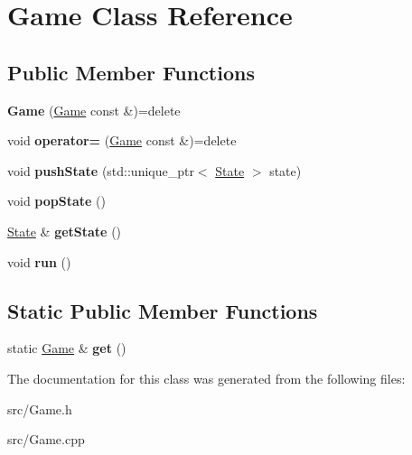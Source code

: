 \hypertarget{classGame}{\section{Game Class Reference}
\label{classGame}
}
\subsection*{Public Member Functions}
\begin{DoxyCompactItemize}
\item 
\hypertarget{classGame_a586a831ed5ff1283fcf1b96f4eff065c}{{\bfseries Game} (\hyperlink{classGame}{Game} const \&)=delete}\label{classGame_a586a831ed5ff1283fcf1b96f4eff065c}

\item 
\hypertarget{classGame_aa4c0eacd8656e54ec4e94877c453e531}{void {\bfseries operator=} (\hyperlink{classGame}{Game} const \&)=delete}\label{classGame_aa4c0eacd8656e54ec4e94877c453e531}

\item 
\hypertarget{classGame_aa808b50e4c19c3ca8907d6a3ab1f473e}{void {\bfseries push\-State} (std\-::unique\-\_\-ptr$<$ \hyperlink{classState}{State} $>$ state)}\label{classGame_aa808b50e4c19c3ca8907d6a3ab1f473e}

\item 
\hypertarget{classGame_a4b33dd67adef59bebadba8a234282c88}{void {\bfseries pop\-State} ()}\label{classGame_a4b33dd67adef59bebadba8a234282c88}

\item 
\hypertarget{classGame_aa742f626e4b8a5dac8677ef40263716c}{\hyperlink{classState}{State} \& {\bfseries get\-State} ()}\label{classGame_aa742f626e4b8a5dac8677ef40263716c}

\item 
\hypertarget{classGame_a1ab78f5ed0d5ea879157357cf2fb2afa}{void {\bfseries run} ()}\label{classGame_a1ab78f5ed0d5ea879157357cf2fb2afa}

\end{DoxyCompactItemize}
\subsection*{Static Public Member Functions}
\begin{DoxyCompactItemize}
\item 
\hypertarget{classGame_ac69a0c5e25c7acb811f4a7b86a2ceb74}{static \hyperlink{classGame}{Game} \& {\bfseries get} ()}\label{classGame_ac69a0c5e25c7acb811f4a7b86a2ceb74}

\end{DoxyCompactItemize}


The documentation for this class was generated from the following files\-:\begin{DoxyCompactItemize}
\item 
src/Game.\-h\item 
src/Game.\-cpp\end{DoxyCompactItemize}
